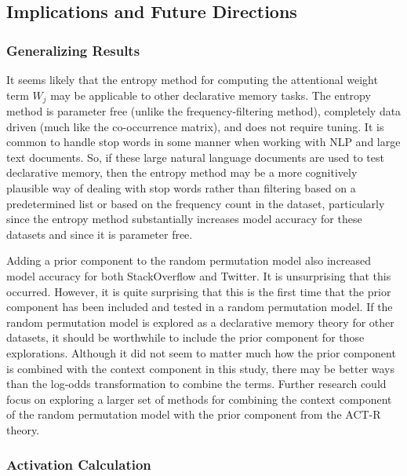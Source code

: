 \documentclass[man,floatsintext,donotrepeattitle]{apa6}
\begin{document}
\subsection{Implications and Future Directions}

\subsubsection{Generalizing Results}

It seems likely that the entropy method for computing the attentional weight term $W_{j}$ may be applicable to other declarative memory tasks.
The entropy method is parameter free (unlike the frequency-filtering method), completely data driven (much like the co-occurrence matrix), and does not require tuning.
It is common to handle stop words in some manner when working with NLP and large text documents.
So, if these large natural language documents are used to test declarative memory, then the entropy method may be a more cognitively plausible way of dealing with stop words rather than 
filtering based on a predetermined list or based on the frequency count in the dataset, particularly since the entropy method substantially increases model accuracy for these datasets and since it is parameter free.

Adding a prior component to the random permutation model also increased model accuracy for both StackOverflow and Twitter.
It is unsurprising that this occurred.
However, it is quite surprising that this is the first time that the prior component has been included and tested in a random permutation model.
If the random permutation model is explored as a declarative memory theory for other datasets, it should be worthwhile to include the prior component for those explorations.
Although it did not seem to matter much how the prior component is combined with the context component in this study, 
there may be better ways than the log-odds transformation to combine the terms.
Further research could focus on exploring a larger set of methods for combining the context component of the random permutation model with the prior component from the ACT-R theory.

\subsubsection{Activation Calculation}
\end{document}

